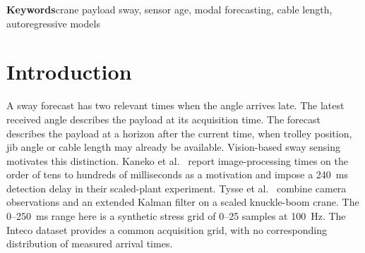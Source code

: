 \begin{abstract}
When payload-sway measurements arrive late, the crane's drive and cable-length measurements may already describe a newer state. We compare quadratic completion of the missing angle samples, direct forecasts from the last measured angle using six modal experts, and an age-weighted blend of the two. Model selection used one previously inspected Inteco record per motion family and ages up to 200~ms. Seven other previously inspected records were used for a retrospective stress test with imposed delays. At 100~ms age, mean absolute angular error without added jitter was 0.566\degs{} for the blend, 0.667\degs{} for completion and 0.626\degs{} for the direct bank. At 250~ms, outside the selection grid, the bank outperformed the blend on all seven records (0.692\degs{} versus 0.742\degs). At that age and a 100~ms forecast horizon, the direct bank scored 0.583\degs{}, the earlier autoregressive reference 0.666\degs{} and the blend 0.700\degs. The blend also inherits its zero-age forecast from an earlier synchronous estimator that already includes autoregressive components. These results characterize when blending helps on the archived records. Independent confirmation on newly acquired trials remains open.
\end{abstract}

\noindent\textbf{Keywords}\quad crane payload sway, sensor age, modal forecasting, cable length, autoregressive models

\section{Introduction}

A sway forecast has two relevant times when the angle arrives late. The latest received angle describes the payload at its acquisition time. The forecast describes the payload at a horizon after the current time, when trolley position, jib angle or cable length may already be available. Vision-based sway sensing motivates this distinction. Kaneko et al.~\cite{kaneko2009} report image-processing times on the order of tens to hundreds of milliseconds as a motivation and impose a 240~ms detection delay in their scaled-plant experiment. Tysse et al.~\cite{tysse2020} combine camera observations and an extended Kalman filter on a scaled knuckle-boom crane. The 0--250~ms range here is a synthetic stress grid of 0--25 samples at 100~Hz. The Inteco dataset provides a common acquisition grid, with no corresponding distribution of measured arrival times.


